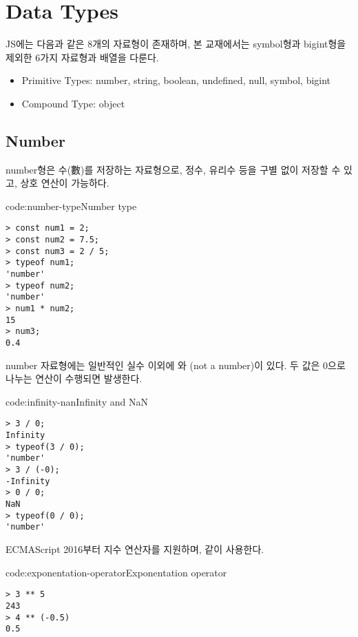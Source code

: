 \section{Data Types}\label{sect:data-types}

JS에는 다음과 같은 8개의 자료형이 존재하며, 본 교재에서는 symbol형과 bigint형을 제외한 6가지 자료형과 배열을 다룬다.

\begin{itemize}
    \item Primitive Types: number, string, boolean, undefined, null, symbol, bigint
    \item Compound Type: object
\end{itemize}

\subsection*{Number}

number형은 수(數)를 저장하는 자료형으로, 정수, 유리수 등을 구별 없이 저장할 수 있고, 상호 연산이 가능하다.

\begin{code}{code:number-type}{Number type}
\begin{verbatim}
> const num1 = 2;
> const num2 = 7.5;
> const num3 = 2 / 5;
> typeof num1;
'number'
> typeof num2;
'number'
> num1 * num2;
15
> num3;
0.4
\end{verbatim}
\end{code}

number 자료형에는 일반적인 실수 이외에 와 (not a number)이 있다. 두 값은 0으로 나누는 연산이 수행되면 발생한다.

\begin{code}{code:infinity-nan}{Infinity and NaN}
\begin{verbatim}
> 3 / 0;
Infinity
> typeof(3 / 0);
'number'
> 3 / (-0);
-Infinity
> 0 / 0;
NaN
> typeof(0 / 0);
'number'
\end{verbatim}
\end{code}

ECMAScript 2016부터 지수 연산자를 지원하며, \와 같이 사용한다.

\begin{code}{code:exponentation-operator}{Exponentation operator}
\begin{verbatim}
> 3 ** 5
243
> 4 ** (-0.5)
0.5
\end{verbatim}
\end{code}

